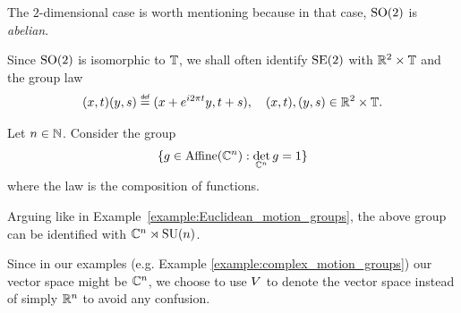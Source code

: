 \begin{example}
\label{example:Euclidean_motion_groups:dimension_2}
    The $2$-dimensional case is worth mentioning because
    in that case, ${\mathrm{SO} (2)}$ is \emph{abelian}.

    Since ${\mathrm{SO} (2)}$ is isomorphic to $\mathbb{T}$,
    we shall often identify ${\mathrm{SE} (2)}$ with $\mathbb{R}^2 \times \mathbb{T}$ and the group law
    \begin{align*}
        (x, t) (y, s) \defeq (x + \e^{\i \turn t} y, t + s), \quad (x, t), (y, s) \in \R^2 \times \T.
    \end{align*}
\end{example}

\begin{example}
    \label{example:complex_motion_groups}
    Let $n \in \mathbb{N}$.
    Consider the group
    \begin{align*}
        \{g \in {\mathrm{Affine} (\mathbb{C}^n)} : \det_{\mathbb{C}^n} g = 1\}
    \end{align*}
    where the law is the composition of functions.

    Arguing like in Example~\ref{example:Euclidean_motion_groups},
    the above group can be identified with $\mathbb{C}^n \rtimes {\mathrm{SU} (n)}$.
\end{example}

\begin{remark}
    Since in our examples (e.g. Example \ref{example:complex_motion_groups}) our vector space might be $\mathbb{C}^n$,
    we choose to use $V$ to denote the vector space instead of simply $\mathbb{R}^n$ to avoid any confusion.
\end{remark}

